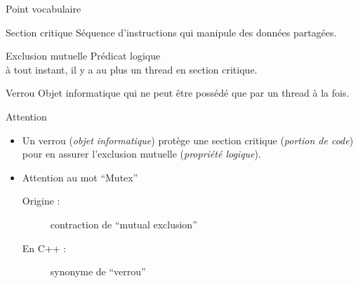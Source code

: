 \begin{frame}[fragile]{Point vocabulaire}

\vspace{-1mm}
  \begin{block}{Section critique}
    Séquence d'instructions qui manipule des données partagées.
  \end{block}

  \begin{block}{Exclusion mutuelle}
    Prédicat logique \\ \og à tout instant, il y a au plus un thread en section critique\fg.
  \end{block}

  \begin{block}{Verrou}
    Objet informatique qui ne peut être possédé que par un thread à la fois.
  \end{block}

  \begin{alertblock}{Attention}
  \begin{itemize}
    \item Un \alert{verrou} (\emph{objet informatique}) protège une
    \alert{section critique} (\emph{portion de code})
    pour en assurer l'\alert{exclusion mutuelle} (\emph{propriété logique}).
    \item Attention au mot ``Mutex''
    \begin{description}
    \item[Origine :] contraction de ``mutual exclusion''
    \item[En C++ :] synonyme de ``verrou''
    \end{description}
    \end{itemize}
  \end{alertblock}
  \vfill
\end{frame}

